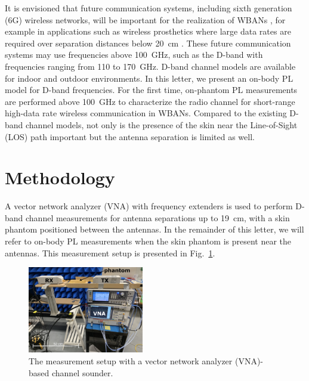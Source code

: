 \documentclass[preprint]{rsl}
\begin{document}
It is envisioned that future communication systems, including sixth generation (6G) wireless networks, will be important for the realization of WBANs \cite{Cornet2022}, for example in applications such as wireless prosthetics where large data rates are required over separation distances below 20~cm \cite{Proesmans2022}.
These future communication systems may use frequencies above 100~GHz, such as the D-band with frequencies ranging from 110 to 170~GHz.
D-band channel models are available for indoor \cite{DeBeelde2021_access, Pometcu2020} and outdoor \cite{DeBeelde2022_tap,DeBeelde2022_wcl} environments. 
In this letter, we present an on-body PL model for D-band frequencies. 
For the first time, on-phantom PL measurements are performed above 100~GHz to characterize the radio channel for short-range high-data rate wireless communication in WBANs.
Compared to the existing D-band channel models, not only is the presence of the skin near the Line-of-Sight (LOS) path important but the antenna separation is limited as well. 


\section{Methodology \label{sect:method}}

A vector network analyzer (VNA) with frequency extenders is used to perform D-band channel measurements for antenna separations up to 19~cm, with a skin phantom positioned between the antennas.
In the remainder of this letter, we will refer to on-body PL measurements when the skin phantom is present near the antennas. 
This measurement setup is presented in Fig.~\ref{fig:sounder_setup}.
\begin{figure}[tb]
\begin{center}
	\includegraphics[width=0.45\textwidth]{figures/measurement_setup}
\caption{The measurement setup with a vector network analyzer (VNA)-based channel sounder.}
\label{fig:sounder_setup}
\end{center}
\end{figure}
\end{document}

